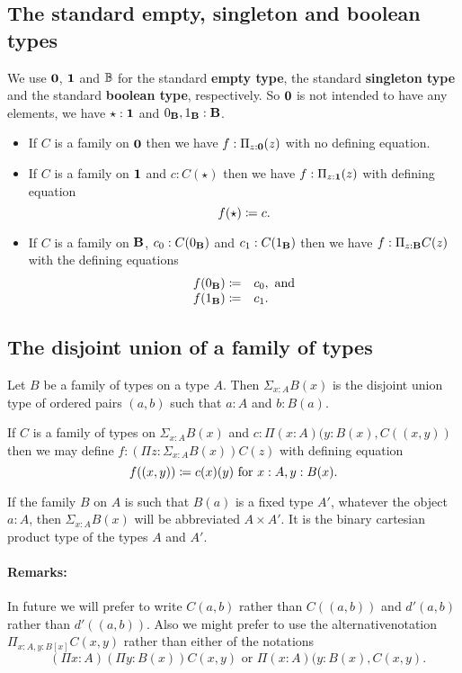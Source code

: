 {\subsection{The standard empty, singleton  and boolean types}
We use ${\bf 0}$, ${\bf 1}$ and $\mathbb{B}$ for the standard {\bf empty type}, the standard {\bf singleton type} and the standard {\bf boolean type}, respectively.  So ${\bf 0}$ is not intended to have any elements, we have $\star:{\bf 1}$ and
$0_{\bf B},1_{\bf B}:{\bf B}$.  
\begin{itemize}
\item If $C$ is a family on ${\bf 0}$ then we have $f:\Pi_{z:{\bf 0}}(z)$ with no defining equation.
\item If $C$ is a family on ${\bf 1}$ and $c:C(\star)$ then we have $f:\Pi_{z:{\bf 1}}(z)$ with defining equation
  \[ f(\star)\coloneqq c.\]
\item If $C$ is a family on ${\bf B}$, $c_0:C(0_{\bf B})$ 
and $c_1:C(1_{\bf B})$ then we have $f:\Pi_{z:{\bf B}}C(z)$ with the defining equations
 \[ \begin{array}{rl}
f(0_{\bf B}) \coloneqq& c_0, \mbox{ and}\\
f(1_{\bf B}) \coloneqq& c_1.
  \end{array}\]
\end{itemize}

\subsection{The disjoint union of a family of types}
Let $B$ be a family of types on a type $A$.  Then $\Sigma_{x:A}B(x)$ is the 
disjoint union type of ordered pairs $(a,b)$ such that $a:A$ and $b:B(a)$.

If $C$ is a family of types on $\Sigma_{x:A}B(x)$ and 
$c:\Pi (x:A)(y:B(x),C((x,y))$ then we may define 
$f:(\Pi z:\Sigma_{x:A}B(x))C(z)$ with defining equation
  \[f((x,y))\coloneqq c(x)(y)\mbox{ for } x:A,y:B(x).\]

If the family $B$ on $A$ is such that $B(a)$ is a fixed type $A'$, whatever the object $a:A$, then $\Sigma_{x:A}B(x)$ will be abbreviated $A\times A'$.  It is the binary cartesian product type of the types $A$ and $A'$.

\paragraph{Remarks:}
In future we will prefer to write $C(a,b)$ rather than $C((a,b))$ and $d'(a,b)$ rather than $d'((a,b))$.  Also we might prefer to use the alternative\linebreak notation $\Pi_{x:A,y:B[x]}C(x,y)$ rather than either of the notations 
\[\mbox{ $(\Pi x:A)(\Pi y:B(x))C(x,y)$ or $\Pi (x:A)(y:B(x),C(x,y)$.}\]

}
